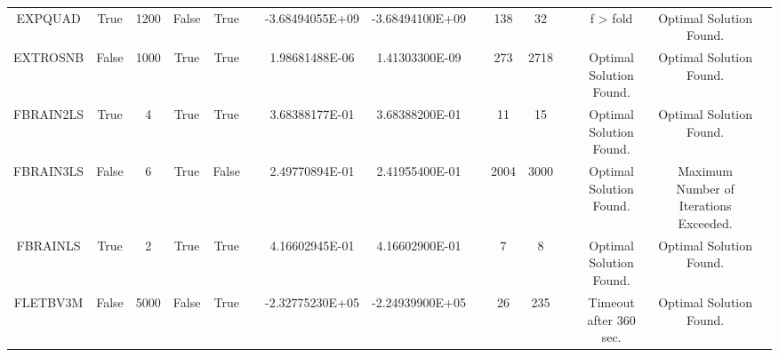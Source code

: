 \begin{longtable}{ccccccccccccccc}
	\cellcolor{default2} EXPQUAD& \cellcolor{default2} True& \cellcolor{default2} 1200& \cellcolor{default2} False& \cellcolor{default2} True& \cellcolor{header} & \cellcolor{ok} -3.68494055E+09& \cellcolor{best} -3.68494100E+09& \cellcolor{header} & \cellcolor{poor} 138& \cellcolor{best} 32& \cellcolor{header} & \cellcolor{default2} f > fold& \cellcolor{default2} Optimal Solution Found.& \cellcolor{header} \\
	\cellcolor{default1} EXTROSNB& \cellcolor{default1} False& \cellcolor{default1} 1000& \cellcolor{default1} True& \cellcolor{default1} True& \cellcolor{header} & \cellcolor{ok} 1.98681488E-06& \cellcolor{best} 1.41303300E-09& \cellcolor{header} & \cellcolor{best} 273& \cellcolor{poor} 2718& \cellcolor{header} & \cellcolor{default1} Optimal Solution Found.& \cellcolor{default1} Optimal Solution Found.& \cellcolor{header} \\
	\cellcolor{default2} FBRAIN2LS& \cellcolor{default2} True& \cellcolor{default2} 4& \cellcolor{default2} True& \cellcolor{default2} True& \cellcolor{header} & \cellcolor{best} 3.68388177E-01& \cellcolor{ok} 3.68388200E-01& \cellcolor{header} & \cellcolor{best} 11& \cellcolor{ok} 15& \cellcolor{header} & \cellcolor{default2} Optimal Solution Found.& \cellcolor{default2} Optimal Solution Found.& \cellcolor{header} \\
	\cellcolor{default1} FBRAIN3LS& \cellcolor{default1} False& \cellcolor{default1} 6& \cellcolor{default1} True& \cellcolor{default1} False& \cellcolor{header} & \cellcolor{poor} 2.49770894E-01& \cellcolor{best} 2.41955400E-01& \cellcolor{header} & \cellcolor{best} 2004& \cellcolor{ok} 3000& \cellcolor{header} & \cellcolor{default1} Optimal Solution Found.& \cellcolor{default1} Maximum Number of Iterations Exceeded.& \cellcolor{header} \\
	\cellcolor{default2} FBRAINLS& \cellcolor{default2} True& \cellcolor{default2} 2& \cellcolor{default2} True& \cellcolor{default2} True& \cellcolor{header} & \cellcolor{ok} 4.16602945E-01& \cellcolor{best} 4.16602900E-01& \cellcolor{header} & \cellcolor{best} 7& \cellcolor{ok} 8& \cellcolor{header} & \cellcolor{default2} Optimal Solution Found.& \cellcolor{default2} Optimal Solution Found.& \cellcolor{header} \\
	\cellcolor{default1} FLETBV3M& \cellcolor{default1} False& \cellcolor{default1} 5000& \cellcolor{default1} False& \cellcolor{default1} True& \cellcolor{header} & \cellcolor{best} -2.32775230E+05& \cellcolor{poor} -2.24939900E+05& \cellcolor{header} & \cellcolor{best} 26& \cellcolor{poor} 235& \cellcolor{header} & \cellcolor{default1} Timeout after 360 sec.& \cellcolor{default1} Optimal Solution Found.& \cellcolor{header} \\

\end{longtable}
